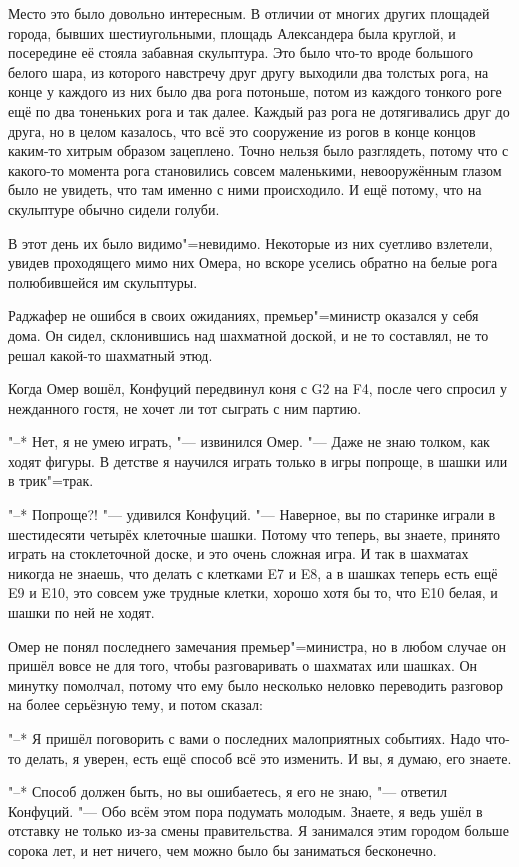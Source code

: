 Место это было довольно интересным.
В отличии от многих других площадей города, бывших шестиугольными, площадь
Александера была круглой, и посередине её стояла забавная скульптура.
Это было что-то вроде большого белого шара, из которого навстречу друг другу
выходили два толстых рога, на конце у каждого из них было два рога потоньше,
потом из каждого тонкого роге ещё по два тоненьких рога и так далее.
Каждый раз рога не дотягивались друг до друга, но в целом казалось, что всё это
сооружение из рогов в конце концов каким-то хитрым образом зацеплено.
Точно нельзя было разглядеть, потому что с какого-то момента рога становились
совсем маленькими, невооружённым глазом было не увидеть, что там именно с ними
происходило.
И ещё потому, что на скульптуре обычно сидели голуби.

В этот день их было видимо"=невидимо.
Некоторые из них суетливо взлетели, увидев проходящего мимо них Омера, но вскоре
уселись обратно на белые рога полюбившейся им скульптуры.

Раджафер не ошибся в своих ожиданиях, премьер"=министр оказался у себя дома.
Он сидел, склонившись над шахматной доской, и не то составлял, не то решал
какой-то шахматный этюд.

Когда Омер вошёл, Конфуций передвинул коня с G2 на F4, после чего спросил у
нежданного гостя, не хочет ли тот сыграть с ним партию.

"--* Нет, я не умею играть, "--- извинился Омер.
"--- Даже не знаю толком, как ходят фигуры.
В детстве я научился играть только в игры попроще, в шашки или в трик"=трак.

"--* Попроще?! "--- удивился Конфуций.
"--- Наверное, вы по старинке играли в шестидесяти четырёх клеточные шашки.
Потому что теперь, вы знаете, принято играть на стоклеточной доске, и это очень
сложная игра.
И так в шахматах никогда не знаешь, что делать с клетками E7 и E8, а в шашках
теперь есть ещё E9 и E10, это совсем уже трудные клетки, хорошо хотя бы то, что
E10 белая, и шашки по ней не ходят.

Омер не понял последнего замечания премьер"=министра, но в любом случае он
пришёл вовсе не для того, чтобы разговаривать о шахматах или шашках.
Он минутку помолчал, потому что ему было несколько неловко переводить разговор
на более серьёзную тему, и потом сказал:

"--* Я пришёл поговорить с вами о последних малоприятных событиях.
Надо что-то делать, я уверен, есть ещё способ всё это изменить.
И вы, я думаю, его знаете.

"--* Способ должен быть, но вы ошибаетесь, я его не знаю, "--- ответил
Конфуций.
"--- Обо всём этом пора подумать молодым.
Знаете, я ведь ушёл в отставку не только из-за смены правительства.
Я занимался этим городом больше сорока лет, и нет ничего, чем можно было бы
заниматься бесконечно.

